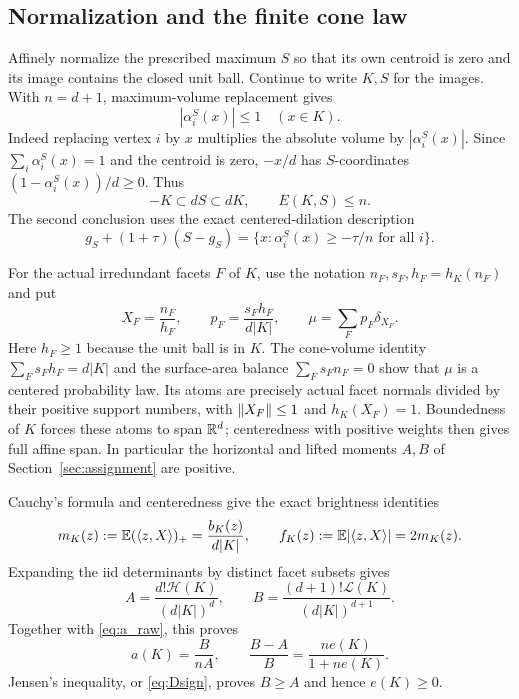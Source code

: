 \subsection{Normalization and the finite cone law}
Affinely normalize the prescribed maximum $S$ so that its own centroid is
zero and its image contains the closed unit ball. Continue to write $K,S$
for the images. With $n=d+1$, maximum-volume replacement gives
\begin{equation}\label{eq:replacement}
 |\alpha_i^S(x)|\le1\quad(x\in K).
\end{equation}
Indeed replacing vertex $i$ by $x$ multiplies the absolute volume by
$|\alpha_i^S(x)|$. Since $\sum_i\alpha_i^S(x)=1$ and the centroid is zero,
$-x/d$ has $S$-coordinates $(1-\alpha_i^S(x))/d\ge0$. Thus
\begin{equation}\label{eq:asymmetry}
 -K\subset dS\subset dK,\qquad E(K,S)\le n.
\end{equation}
The second conclusion uses the exact centered-dilation description
\begin{equation}\label{eq:dilationcoords}
 g_S+(1+\tau)(S-g_S)=\{x:\alpha_i^S(x)\ge-\tau/n\text{ for all }i\}.
\end{equation}

For the actual irredundant facets $F$ of $K$, use the notation
$n_F,s_F,h_F=h_K(n_F)$ and put
\begin{equation}\label{eq:law}
 X_F=\frac{n_F}{h_F},\qquad p_F=\frac{s_Fh_F}{d|K|},\qquad
 \mu=\sum_F p_F\delta_{X_F}.
\end{equation}
Here $h_F\ge1$ because the unit ball is in $K$. The cone-volume identity
$\sum_Fs_Fh_F=d|K|$ and the surface-area balance $\sum_Fs_Fn_F=0$ show
that $\mu$ is a centered probability law. Its atoms are precisely actual
facet normals divided by their positive support numbers, with
$\lVert X_F\rVert\le1$ and $h_K(X_F)=1$.
Boundedness of $K$ forces these atoms to span $\mathbb R^d$; centeredness with
positive weights then gives full affine span. In particular the horizontal
and lifted moments $A,B$ of Section~\ref{sec:assignment} are positive.

Cauchy's formula and centeredness give the exact brightness identities
\begin{equation}\label{eq:brightness}
 m_K(z):=\mathbb E(\langle z,X\rangle)_+=\frac{b_K(z)}{d|K|},\qquad
 f_K(z):=\mathbb E|\langle z,X\rangle|=2m_K(z).
\end{equation}
Expanding the iid determinants by distinct facet subsets gives
\[
 A=\frac{d!\mathcal H(K)}{(d|K|)^d},\qquad
 B=\frac{(d+1)!\mathcal L(K)}{(d|K|)^{d+1}}.
\]
Together with \eqref{eq:a_raw}, this proves
\begin{equation}\label{eq:momentdefect}
 a(K)=\frac{B}{nA},\qquad
 \frac{B-A}{B}=\frac{ne(K)}{1+ne(K)}.
\end{equation}
Jensen's inequality, or \eqref{eq:Dsign}, proves $B\ge A$ and hence $e(K)\ge0$.

